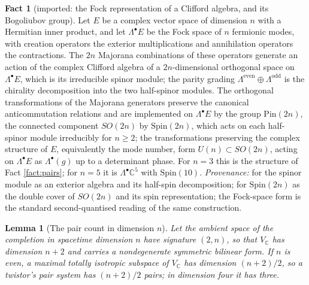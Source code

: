 \documentclass[11pt]{article}
\newtheorem{lemma}[theorem]{Lemma}
\theoremstyle{definition}
\newtheorem{fact}[theorem]{Fact}
\newcommand{\C}{\mathbb{C}}
\begin{document}
\begin{fact}[imported: the Fock representation of a Clifford algebra, and its Bogoliubov group]\label{fact:fock}
Let $E$ be a complex vector space of dimension $n$ with a Hermitian inner product, and let $\Lambda^{\bullet}E$ be the Fock space of $n$ fermionic modes, with creation operators the exterior multiplications and annihilation operators the contractions. The $2n$ Majorana combinations of these operators generate an action of the complex Clifford algebra of a $2n$-dimensional orthogonal space on $\Lambda^{\bullet}E$, which is its irreducible spinor module; the parity grading $\Lambda^{\mathrm{even}} \oplus \Lambda^{\mathrm{odd}}$ is the chirality decomposition into the two half-spinor modules. The orthogonal transformations of the Majorana generators preserve the canonical anticommutation relations and are implemented on $\Lambda^{\bullet}E$ by the group $\mathrm{Pin}(2n)$, the connected component $SO(2n)$ by $\mathrm{Spin}(2n)$, which acts on each half-spinor module irreducibly for $n \ge 2$; the transformations preserving the complex structure of $E$, equivalently the mode number, form $U(n) \subset SO(2n)$, acting on $\Lambda^{\bullet}E$ as $\Lambda^{\bullet}(g)$ up to a determinant phase. For $n = 3$ this is the structure of Fact \ref{fact:pairs}; for $n = 5$ it is $\Lambda^{\bullet}\C^{5}$ with $\mathrm{Spin}(10)$. \emph{Provenance:} \cite[Lecture~20, \S 20.1]{FultonHarris1991} for the spinor module as an exterior algebra and its half-spin decomposition; \cite[Ch.~I, \S\S 2, 5]{LawsonMichelsohn1989} for $\mathrm{Spin}(2n)$ as the double cover of $SO(2n)$ and its spin representation; the Fock-space form is the standard second-quantised reading of the same construction.
\end{fact}

\begin{lemma}[The pair count in dimension $n$]\label{lem:paircount}
Let the ambient space of the completion in spacetime dimension $n$ have signature $(2, n)$, so that $V_{\C}$ has dimension $n + 2$ and carries a nondegenerate symmetric bilinear form. If $n$ is even, a maximal totally isotropic subspace of $V_{\C}$ has dimension $(n+2)/2$, so a twistor's pair system has $(n+2)/2$ pairs; in dimension four it has three.
\end{lemma}
\end{document}
